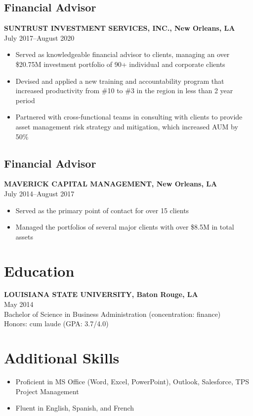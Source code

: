 \documentclass[11pt,a4paper]{article}
\begin{document}
\subsection{Financial Advisor}
\vspace{-0.5em}
\textbf{SUNTRUST INVESTMENT SERVICES, INC., New Orleans, LA}\\
July 2017--August 2020
\vspace{-0.5em}
\begin{itemize}
    \item Served as knowledgeable financial advisor to clients, managing an over \$20.75M investment portfolio of 90+ individual and corporate clients
    \item Devised and applied a new training and accountability program that increased productivity from \#10 to \#3 in the region in less than 2 year period
    \item Partnered with cross-functional teams in consulting with clients to provide asset management risk strategy and mitigation, which increased AUM by 50\%
\end{itemize}

\subsection{Financial Advisor}
\vspace{-0.5em}
\textbf{MAVERICK CAPITAL MANAGEMENT, New Orleans, LA}\\
July 2014--August 2017
\vspace{-0.5em}
\begin{itemize}
    \item Served as the primary point of contact for over 15 clients
    \item Managed the portfolios of several major clients with over \$8.5M in total assets
\end{itemize}

\section{Education}

\textbf{LOUISIANA STATE UNIVERSITY, Baton Rouge, LA}\\
May 2014\\
Bachelor of Science in Business Administration (concentration: finance)\\ Honors: cum laude (GPA: 3.7/4.0)

\section{Additional Skills}

\begin{itemize}
    \item Proficient in MS Office (Word, Excel, PowerPoint), Outlook, Salesforce, TPS Project Management
    \item Fluent in English, Spanish, and French
\end{itemize}
\end{document}
